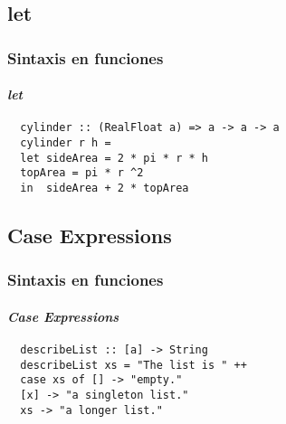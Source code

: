 \subsection{let}
\begin{frame}[fragile]
  \frametitle{Sintaxis en funciones}
  \framesubtitle{\emph{let}}
  {\color{white}
    \begin{verbatim}
  cylinder :: (RealFloat a) => a -> a -> a
  cylinder r h =
  let sideArea = 2 * pi * r * h
  topArea = pi * r ^2
  in  sideArea + 2 * topArea
\end{verbatim}
}
\end{frame}
\subsection{Case Expressions}
\begin{frame}[fragile]
  \frametitle{Sintaxis en funciones}
  \framesubtitle{\emph{Case Expressions}}
  {\color{white}
  \begin{verbatim}
  describeList :: [a] -> String
  describeList xs = "The list is " ++
  case xs of [] -> "empty."
  [x] -> "a singleton list."
  xs -> "a longer list."
\end{verbatim}
}
\end{frame}